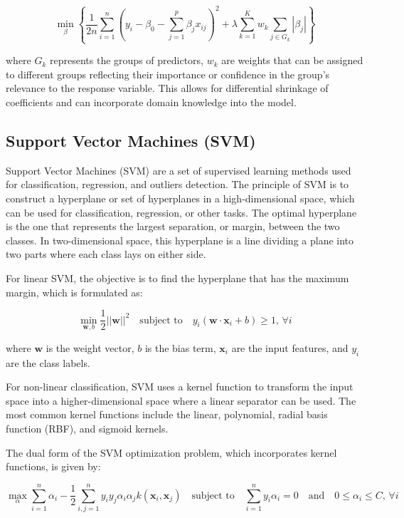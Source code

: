 \documentclass[12pt]{article}
\begin{document}
\begin{equation}
	\min_{\beta} \left\{ \frac{1}{2n} \sum_{i=1}^{n} (y_i - \beta_0 - \sum_{j=1}^{p} \beta_j x_{ij})^2 + \lambda \sum_{k=1}^{K} w_k \sum_{j \in G_k} |\beta_j| \right\}
\end{equation}

where $G_k$ represents the groups of predictors, $w_k$ are weights that can be assigned to different groups reflecting their importance or confidence in the group's relevance to the response variable. This allows for differential shrinkage of coefficients and can incorporate domain knowledge into the model.

\subsection{Support Vector Machines (SVM)}
Support Vector Machines (SVM) are a set of supervised learning methods used for classification, regression, and outliers detection. The principle of SVM is to construct a hyperplane or set of hyperplanes in a high-dimensional space, which can be used for classification, regression, or other tasks. The optimal hyperplane is the one that represents the largest separation, or margin, between the two classes. In two-dimensional space, this hyperplane is a line dividing a plane into two parts where each class lays on either side.

For linear SVM, the objective is to find the hyperplane that has the maximum margin, which is formulated as:

\begin{equation}
	\min_{\mathbf{w}, b} \frac{1}{2} ||\mathbf{w}||^2 \quad \text{subject to} \quad y_i (\mathbf{w} \cdot \mathbf{x}_i + b) \geq 1, \, \forall i
\end{equation}

where $\mathbf{w}$ is the weight vector, $b$ is the bias term, $\mathbf{x}_i$ are the input features, and $y_i$ are the class labels.

For non-linear classification, SVM uses a kernel function to transform the input space into a higher-dimensional space where a linear separator can be used. The most common kernel functions include the linear, polynomial, radial basis function (RBF), and sigmoid kernels.

The dual form of the SVM optimization problem, which incorporates kernel functions, is given by:

\begin{equation}
	\max_{\alpha} \sum_{i=1}^{n} \alpha_i - \frac{1}{2} \sum_{i,j=1}^{n} y_i y_j \alpha_i \alpha_j k(\mathbf{x}_i, \mathbf{x}_j) \quad \text{subject to} \quad \sum_{i=1}^{n} y_i \alpha_i = 0 \quad \text{and} \quad 0 \leq \alpha_i \leq C, \, \forall i
\end{equation}
\end{document}
